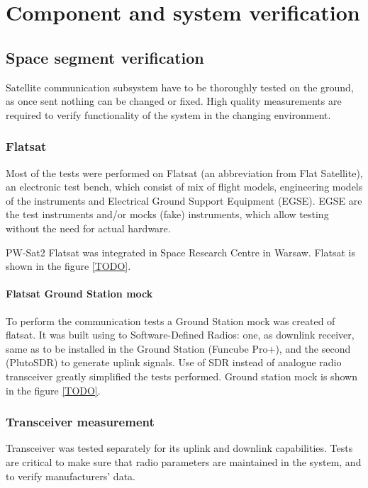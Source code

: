 \chapter{Component and system verification}



\section{Space segment verification}

Satellite communication subsystem have to be thoroughly tested on the ground, as once sent nothing can be changed or fixed. High quality measurements are required to verify functionality of the system in the changing environment.

\subsection{Flatsat}

Most of the tests were performed on Flatsat (an abbreviation from Flat Satellite), an electronic test bench, which consist of mix of flight models, engineering models of the instruments and Electrical Ground Support Equipment (EGSE). EGSE are the test instruments and/or mocks (fake) instruments, which allow testing without the need for actual hardware.

PW-Sat2 Flatsat was integrated in Space Research Centre in Warsaw. Flatsat is shown in the figure \ref{TODO}.

\subsubsection{Flatsat Ground Station mock}
To perform the communication tests a Ground Station mock was created of flatsat. It was built using to Software-Defined Radios: one, as downlink receiver, same as to be installed in the Ground Station (Funcube Pro+), and the second (PlutoSDR) to generate uplink signals. Use of SDR instead of analogue radio transceiver greatly simplified the tests performed. Ground station mock is shown in the figure \ref{TODO}. 


\subsection{Transceiver measurement}
Transceiver was tested separately for its uplink and downlink capabilities. Tests are critical to make sure that radio parameters are maintained in the system, and to verify manufacturers' data.

